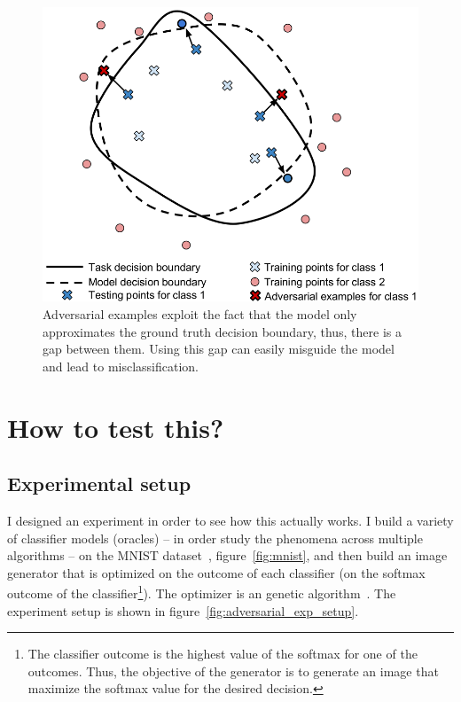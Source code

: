   \begin{figure}
    \centering
    \includegraphics[scale=0.3]{images/adv_attack/gen_er4.png}
    \caption{Adversarial examples exploit the fact that the model only approximates the ground truth decision boundary, thus, there is a gap between them. Using this gap can easily misguide the model and lead to misclassification.}
    \label{fig:gen_er4}
  \end{figure}

\section{How to test this?}
  \subsection{Experimental setup}
    \par I designed an experiment in order to see how this actually works. I build a variety of classifier models (oracles) -- in order study the phenomena across multiple algorithms -- on the MNIST dataset~\citep{lecun-mnisthandwrittendigit-2010}, figure~\ref{fig:mnist}, and then build an image generator that is optimized on the outcome of each classifier (on the softmax outcome of the classifier\footnote{The classifier outcome is the highest value of the softmax for one of the outcomes. Thus, the objective of the generator is to generate an image that maximize the softmax value for the desired decision.}). The optimizer is an genetic algorithm~\citep{eiben2003introduction}. The experiment setup is shown in figure~\ref{fig:adversarial_exp_setup}.

